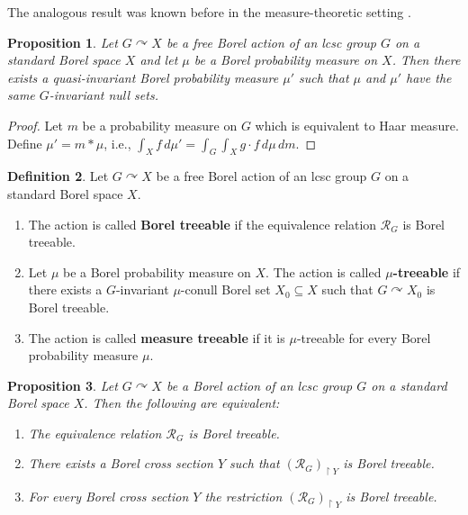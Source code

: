 \documentclass[11pt]{amsart}
\theoremstyle{definition}
\newtheorem{definition}{Definition}[section]
\theoremstyle{plain}
\newtheorem{proposition}[definition]{Proposition}
\newcommand{\<}{\langle}
\renewcommand{\>}{\rangle}
\newcommand{\define}[1]{\textbf{#1}}
\newcommand\RR{\mathscr{R}}
\begin{document}
\begin{appendices}
The analogous result was known before in the measure-theoretic setting \cite{Forrest-1974}.


\begin{proposition}\label{prop:qinv}
Let $G\curvearrowright X$ be a free Borel action of an lcsc group $G$ on a standard Borel space $X$ and let $\mu$ be a Borel probability measure on $X$. Then there exists a quasi-invariant Borel probability measure $\mu '$ such that $\mu$ and $\mu '$ have the same $G$-invariant null sets.
\end{proposition}

\begin{proof}
Let $m$ be a probability measure on $G$ which is equivalent to Haar measure. Define $\mu ' = m\ast \mu$, i.e., $\int _X f\, d\mu ' = \int _G \int _X g\cdot f \, d\mu \, dm$.
\end{proof}

\begin{definition}\label{def: B, mu, measure treeable}
Let $G\curvearrowright X$ be a free Borel action of an lcsc group $G$ on a standard Borel space $X$.
\begin{enumerate}
\item The action is called \define{Borel treeable} if the equivalence relation $\RR_G$ is Borel treeable.
\item Let $\mu$ be a Borel probability measure on $X$. The action is called
\define{$\mu$-treeable} if there exists a $G$-invariant $\mu$-conull Borel set $X_0\subseteq X$ such that $G\curvearrowright X_0$ is Borel treeable.
\item\label{def: measure treeable action} The action is called \define{measure treeable} if it is $\mu$-treeable for every Borel probability measure $\mu$.
\end{enumerate}
\end{definition}

\begin{proposition}
Let $G\curvearrowright X$ be a Borel action of an lcsc group $G$ on a standard Borel space $X$. Then the following are equivalent:
\begin{enumerate}
\item The equivalence relation $\RR_G$ is Borel treeable.
\item There exists a Borel cross section $Y$ such that $(\RR_{G})_{\restriction Y}$ is Borel treeable.
\item For every Borel cross section $Y$ the restriction $(\RR_{G})_{\restriction Y}$ is Borel treeable.
\end{enumerate}
\end{proposition}


\end{appendices}
\end{document}
